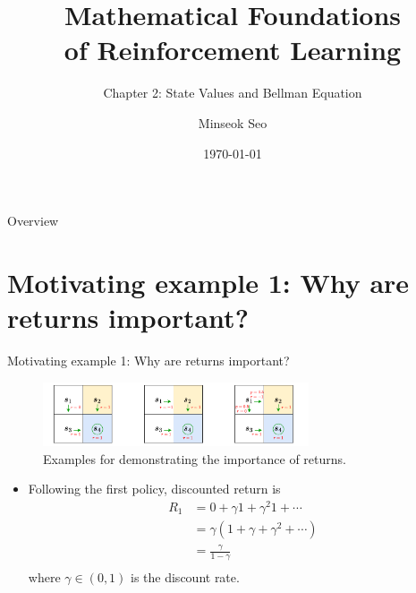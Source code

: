 \documentclass[aspectratio=169,xcolor=dvipsnames]{beamer}
\title{Mathematical Foundations \\ of Reinforcement Learning}
\subtitle{Chapter 2: State Values and Bellman Equation}
\author{Minseok Seo}
\institute
{
    Artificial Intelligence Graduate School \\
    Gwangju Institute of Science and Technology (GIST) %
}
\date{\today} %
\begin{document}
\begin{frame}
    \titlepage
\end{frame}

\begin{frame}{Overview}
    \tableofcontents
\end{frame}

\section{Motivating example 1: Why are returns important?}

\begin{frame}{Motivating example 1: Why are returns important?}
    
\begin{figure}
	\centering
	\includegraphics[width=0.7\textwidth]{../imgs/chap2/ex_importance_returns.pdf}
	\caption{Examples for demonstrating the importance of returns.}
	\label{fig:importance_returns}
\end{figure}

\begin{itemize}
	\item Following the first policy, discounted return is
	\begin{equation*}
		\begin{aligned}
			R_1 
			&= 0 + \gamma 1 + \gamma^2 1 + \cdots \\
			&= \gamma (1 + \gamma + \gamma^2 + \cdots) \\
			&= \frac{\gamma}{1 - \gamma} \\
		\end{aligned}
	\end{equation*}
	where $\gamma \in (0, 1)$ is the discount rate.
\end{itemize}

\end{frame}
\end{document}
